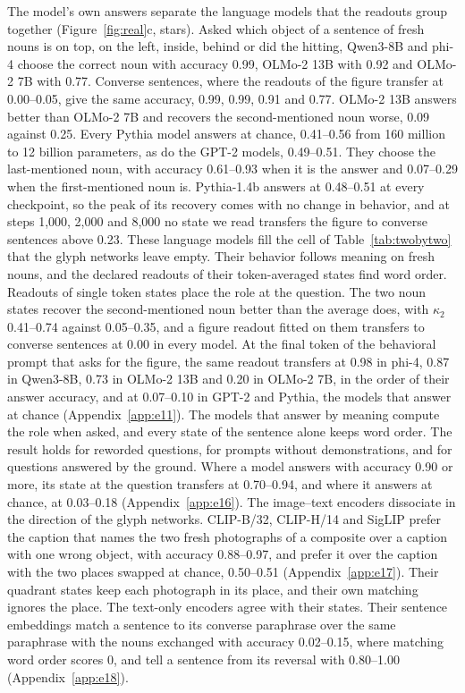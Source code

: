 \documentclass[10pt]{article}
\theoremstyle{plain}
\theoremstyle{remark}
\begin{document}
The model's own answers separate the language models that the readouts group together (Figure~\ref{fig:real}c, stars). Asked which object of a sentence of fresh nouns is on top, on the left, inside, behind or did the hitting, Qwen3-8B and phi-4 choose the correct noun with accuracy 0.99, OLMo-2 13B with 0.92 and OLMo-2 7B with 0.77. Converse sentences, where the readouts of the figure transfer at 0.00--0.05, give the same accuracy, 0.99, 0.99, 0.91 and 0.77. OLMo-2 13B answers better than OLMo-2 7B and recovers the second-mentioned noun worse, 0.09 against 0.25. Every Pythia model answers at chance, 0.41--0.56 from 160 million to 12 billion parameters, as do the GPT-2 models, 0.49--0.51. They choose the last-mentioned noun, with accuracy 0.61--0.93 when it is the answer and 0.07--0.29 when the first-mentioned noun is. Pythia-1.4b answers at 0.48--0.51 at every checkpoint, so the peak of its recovery comes with no change in behavior, and at steps 1{,}000, 2{,}000 and 8{,}000 no state we read transfers the figure to converse sentences above 0.23. These language models fill the cell of Table~\ref{tab:twobytwo} that the glyph networks leave empty. Their behavior follows meaning on fresh nouns, and the declared readouts of their token-averaged states find word order. Readouts of single token states place the role at the question. The two noun states recover the second-mentioned noun better than the average does, with $\kappa_2$ 0.41--0.74 against 0.05--0.35, and a figure readout fitted on them transfers to converse sentences at 0.00 in every model. At the final token of the behavioral prompt that asks for the figure, the same readout transfers at 0.98 in phi-4, 0.87 in Qwen3-8B, 0.73 in OLMo-2 13B and 0.20 in OLMo-2 7B, in the order of their answer accuracy, and at 0.07--0.10 in GPT-2 and Pythia, the models that answer at chance (Appendix~\ref{app:e11}). The models that answer by meaning compute the role when asked, and every state of the sentence alone keeps word order. The result holds for reworded questions, for prompts without demonstrations, and for questions answered by the ground. Where a model answers with accuracy 0.90 or more, its state at the question transfers at 0.70--0.94, and where it answers at chance, at 0.03--0.18 (Appendix~\ref{app:e16}). The image--text encoders dissociate in the direction of the glyph networks. CLIP-B/32, CLIP-H/14 and SigLIP prefer the caption that names the two fresh photographs of a composite over a caption with one wrong object, with accuracy 0.88--0.97, and prefer it over the caption with the two places swapped at chance, 0.50--0.51 (Appendix~\ref{app:e17}). Their quadrant states keep each photograph in its place, and their own matching ignores the place. The text-only encoders agree with their states. Their sentence embeddings match a sentence to its converse paraphrase over the same paraphrase with the nouns exchanged with accuracy 0.02--0.15, where matching word order scores 0, and tell a sentence from its reversal with 0.80--1.00 (Appendix~\ref{app:e18}).
\end{document}
